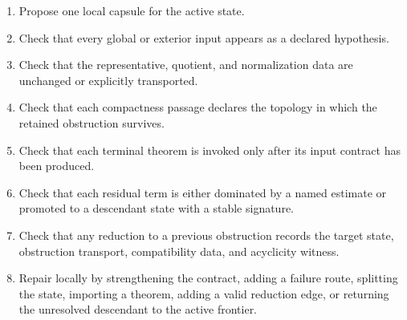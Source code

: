 \documentclass[11pt]{article}
\theoremstyle{plain}
\theoremstyle{definition}
\theoremstyle{remark}
\begin{document}
\begin{enumerate}
  \item Propose one local capsule for the active state.
  \item Check that every global or exterior input appears as a declared
  hypothesis.
  \item Check that the representative, quotient, and normalization
  data are unchanged or explicitly transported.
  \item Check that each compactness passage declares the topology in which the
  retained obstruction survives.
  \item Check that each terminal theorem is invoked only after its input
  contract has been produced.
  \item Check that each residual term is either dominated by a named estimate
  or promoted to a descendant state with a stable signature.
  \item Check that any reduction to a previous obstruction records the target
  state, obstruction transport, compatibility data, and acyclicity witness.
  \item Repair locally by strengthening the contract, adding a failure route,
  splitting the state, importing a theorem, adding a valid reduction edge, or
  returning the unresolved descendant to the active frontier.
\end{enumerate}
\end{document}
